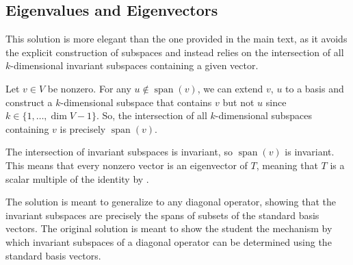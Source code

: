 \subsection{Eigenvalues and Eigenvectors}


This solution is more elegant than the one provided in the main text, as it avoids the explicit construction of subspaces and instead relies on the intersection of all $k$-dimensional invariant subspaces containing a given vector.

\begin{csp}
    Let $v \in V$ be nonzero. For any $u \notin \operatorname{span}(v)$, we can extend $v$, $u$ to a basis and construct a $k$-dimensional subspace that contains $v$ but not $u$ since $k \in \{1, \dots, \dim V-1\}$. So, the intersection of all $k$-dimensional subspaces containing $v$ is precisely $\operatorname{span}(v)$.

    The intersection of invariant subspaces is invariant, so $\operatorname{span}(v)$ is invariant. This means that every nonzero vector is an eigenvector of $T$, meaning that $T$ is a scalar multiple of the identity by .
\end{csp}


The solution is meant to generalize to any diagonal operator, showing that the invariant subspaces are precisely the spans of subsets of the standard basis vectors.
The original solution is meant to show the student the mechanism by which invariant subspaces of a diagonal operator can be determined using the standard basis vectors.

